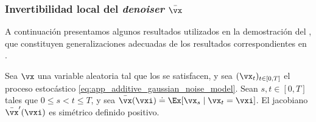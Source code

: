 \documentclass[../../book-main_es.tex]{subfiles}
\begin{document}
\subsubsection{Invertibilidad local del \textit{denoiser} \(\bar{\vx}\)}

A continuación presentamos algunos resultados utilizados en la demostración del
, que constituyen
generalizaciones adecuadas de los resultados correspondientes en \cite{Gribonval2011-pf}.

\begin{lemma}\label{lem:gribonval_A1}
    Sea \(\vx\) una variable aleatoria tal que los
    se satisfacen, y sea \((\vx_{t})_{t \in [0, T]}\) el proceso estocástico
    \eqref{eq:app_additive_gaussian_noise_model}. Sean \(s, t
    \in [0, T]\) tales que \(0 \leq s < t \leq T\), y sea
    \(\bar{\vx}(\vxi) \doteq \Ex[\vx_{s} \mid \vx_{t} = \vxi]\). El
    jacobiano \(\bar{\vx}^{\prime}(\vxi)\) es simétrico definido positivo.
\end{lemma}
\end{document}
